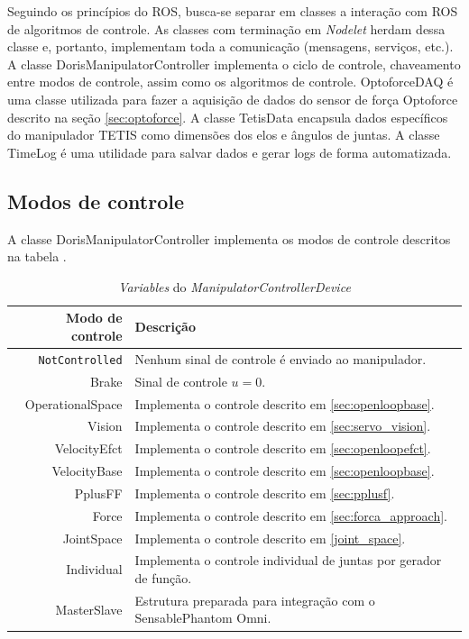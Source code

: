 Seguindo os princípios do ROS, busca-se separar em classes a interação com ROS de algoritmos de controle. As classes com terminação em \textit{Nodelet} herdam dessa classe e, portanto, implementam toda a comunicação (mensagens, serviços, etc.). A classe DorisManipulatorController implementa o ciclo de controle, chaveamento entre modos de controle, assim como os algoritmos de controle. OptoforceDAQ é uma classe utilizada para fazer a aquisição de dados do sensor de força Optoforce descrito na seção \ref{sec:optoforce}. A classe TetisData encapsula dados específicos do manipulador TETIS como dimensões dos elos e ângulos de juntas. A classe TimeLog é uma utilidade para salvar dados e gerar logs de forma automatizada. 

\subsection{Modos de controle} \label{sec:ctrlmodes}

A classe DorisManipulatorController implementa os modos de controle descritos na tabela . 


\begin{table}[h!]
\centering
\caption{\textit{Variables} do \textit{ManipulatorControllerDevice}}
\label{tab:variables}
\begin{tabular}{rl} \hline
Modo de controle      	& Descrição \\ \hline
\verb|NotControlled|  	& Nenhum sinal de controle é enviado ao manipulador.\\
Brake 				  	& Sinal de controle $u = 0$. \\
OperationalSpace 	  	& Implementa o controle descrito em \ref{sec:openloopbase}. \\
Vision 				  	& Implementa o controle descrito em \ref{sec:servo_vision}. \\
VelocityEfct 			& Implementa o controle descrito em \ref{sec:openloopefct}. \\
VelocityBase 			& Implementa o controle descrito em \ref{sec:openloopbase}. \\
PplusFF 				& Implementa o controle descrito em \ref{sec:pplusf}. \\
Force 					& Implementa o controle descrito em \ref{sec:forca_approach}. \\
JointSpace 				& Implementa o controle descrito em \ref{joint_space}. \\
Individual 				& Implementa o controle individual de juntas por gerador de função. \\
MasterSlave				& Estrutura preparada para integração com o Sensable\circledR Phantom Omni. \\
\hline
\end{tabular}
\end{table}

